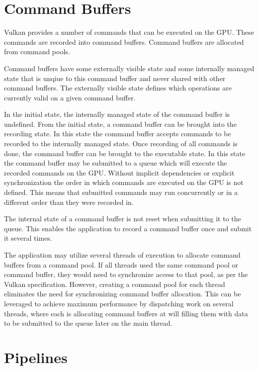 
  \section{Command Buffers}
  \label{sec:CommandBuffers}
    Vulkan provides a number of commands that can be executed on the GPU. These commands are recorded into command buffers. Command buffers are allocated from command pools.

    Command buffers have some externally visible state and some internally managed state that is unqiue to this command buffer and never shared with other command buffers. The externally visible state defines which operations are currently valid on a given command buffer.

    In the initial state, the internally managed state of the command buffer is undefined. From the initial state, a command buffer can be brought into the recording state. In this state the command buffer accepts commands to be recorded to the internally managed state. Once recording of all commands is done, the command buffer can be brought to the executable state. In this state the command buffer may be submitted to a queue which will execute the recorded commands on the GPU. Without implicit dependencies or explicit synchronization the order in which commands are executed on the GPU is not defined. This means that submitted commands may run concurrently or in a different order than they were recorded in.

    The internal state of a command buffer is not reset when submitting it to the queue. This enables the \gls{application} to record a command buffer once and submit it several times.

    The \gls{application} may utilize several threads of execution to allocate command buffers from a command pool. If all threads used the same command pool or command buffer, they would need to synchronize access to that pool, as per the Vulkan specification. However, creating a command pool for each thread eliminates the need for synchronizing command buffer allocation. This can be leveraged to achieve maximum performance by dispatching work on several threads, where each is allocating command buffers at will filling them with data to be submitted to the queue later on the main thread.

  \section{Pipelines}

